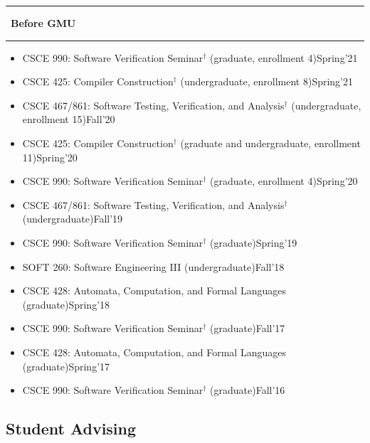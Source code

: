 \documentclass[11pt]{article}
\newcommand{\beforegmu}{\begin{center}\rule{2in}{0.8pt}~\textbf{Before GMU}~\rule{2in}{0.8pt}\end{center}}
\begin{document}
\vspace{0.1in}
\beforegmu{}
\vspace{0.1in}

\begin{itemize}
    \item CSCE 990: Software Verification Seminar$^{\dagger}$ (graduate, enrollment 4)\hfill Spring'21
    \item CSCE 425: Compiler Construction$^{\dagger}$ (undergraduate, enrollment 8)\hfill Spring'21
    \item CSCE 467/861: Software Testing, Verification, and Analysis$^{\dagger}$ (undergraduate, enrollment 15)\hfill Fall'20
    \item CSCE 425: Compiler Construction$^{\dagger}$ (graduate and undergraduate, enrollment 11)\hfill Spring'20
    \item CSCE 990: Software Verification Seminar$^{\dagger}$ (graduate, enrollment 4)\hfill Spring'20
    \item CSCE 467/861: Software Testing, Verification, and Analysis$^{\dagger}$ (undergraduate)\hfill Fall'19
    \item CSCE 990: Software Verification Seminar$^{\dagger}$ (graduate)\hfill Spring'19
    \item SOFT 260: Software Engineering III (undergraduate)\hfill Fall'18
    \item CSCE 428: Automata, Computation, and Formal Languages (graduate)\hfill Spring'18
    \item CSCE 990: Software Verification Seminar$^{\dagger}$ (graduate)\hfill Fall'17
    \item CSCE 428: Automata, Computation, and Formal Languages (graduate)\hfill Spring'17
    \item CSCE 990: Software Verification Seminar$^{\dagger}$ (graduate)\hfill Fall'16
\end{itemize}





\subsection{Student Advising}

\newcommand{\linhan}{
\item Linhan Li (PhD student)\hfill Spring 2021--present
}
\end{document}
